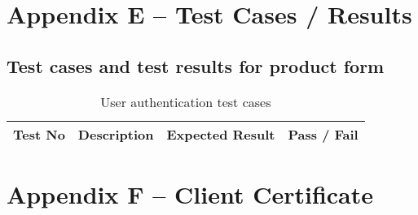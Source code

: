 \documentclass[12pt]{report}
\begin{document}
\setcounter{chapter}{5}
\setcounter{section}{0}
\setcounter{figure}{0}
\chapter*{\Huge Appendix E – Test Cases / Results}

\section{Test cases and test results for product form}
\begin{table}[H]
	\begin{tabular}{ | p{1cm} | p{5cm} | p{5cm} | p{2cm} | }
		\hline
		\bf{Test No} & \bf{Description} & \bf{Expected Result} & \bf{Pass / Fail} \\
		\hline
	\end{tabular}
	\caption{User authentication test cases}
\end{table}


\chapter*{\Huge Appendix F – Client Certificate}
\end{document}

